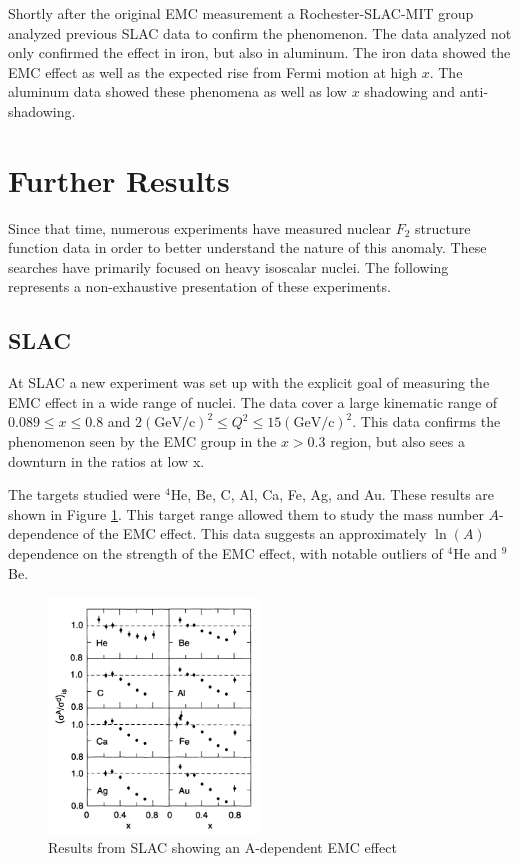 Shortly after the original EMC measurement a Rochester-SLAC-MIT group analyzed previous SLAC data to confirm the phenomenon. The data analyzed not only confirmed the effect in iron, but also in aluminum. The iron data showed the EMC effect as well as the expected rise from Fermi motion at high $x$. The aluminum data showed these phenomena as well as low $x$ shadowing and anti-shadowing. \cite{bodek_Fe,bodek_Al,Norton}

\section{Further Results}

Since that time, numerous experiments have measured nuclear $F_2$ structure function data in order to better understand the nature of this anomaly. These searches have primarily focused on heavy isoscalar nuclei. The following represents a non-exhaustive presentation of these experiments.

\subsection{SLAC}
At SLAC a new experiment was set up with the explicit goal of measuring the EMC effect in a wide range of nuclei. The data cover a large kinematic range of $0.089 \le x \le 0.8$ and $2 \left(\textrm{GeV/c}\right)^2 \le Q^2 \le 15 \left(\textrm{GeV/c}\right)^2$. This data confirms the phenomenon seen by the EMC group in the $x>0.3$ region, but also sees a downturn in the ratios at low x. 

The targets studied were $^4$He, Be, C, Al, Ca, Fe, Ag, and Au. These results are shown in Figure \ref{gomez_results}. This target range allowed them to study the mass number $A$-dependence of the EMC effect. This data suggests an approximately $\ln\left(A\right)$ dependence on the strength of the EMC effect, with notable outliers of $^4$He and $^9$Be. \cite{Arnold,Gomez}

\begin{figure}[h]
\begin{center}
	\includegraphics[width=0.5\textwidth]{./EMC/fig/gomez.png}
	\caption{Results from SLAC showing an A-dependent EMC effect\cite{Gomez}}
	\label{gomez_results}
\end{center}
\end{figure}

